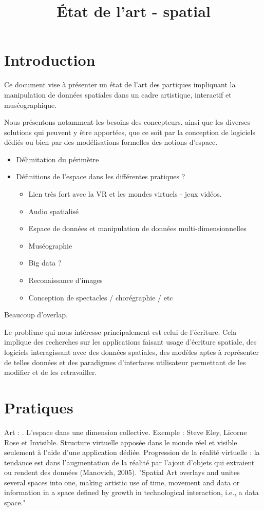 \documentclass[french,12pt]{article}
\title{État de l'art - spatial}
\begin{document}
\maketitle

\section{Introduction}
Ce document vise à présenter un état de l'art des partiques impliquant la manipulation de 
données spatiales dans un cadre artistique, interactif et muséographique.

Nous présentons notamment les besoins des concepteurs, ainsi que les diverses solutions qui 
peuvent y être apportées, que ce soit par la conception de logiciels dédiés ou bien 
par des modélisations formelles des notions d'espace.
 
\begin{itemize}
    
\item Délimitation du périmètre
 
\item Définitions de l'espace dans les différentes pratiques ?
 
 \begin{itemize}
  \item Lien très fort avec la VR et les mondes virtuels - jeux vidéos.
  \item Audio spatialisé
  \item Espace de données et manipulation de données multi-dimensionnelles
  \item Muséographie
  \item Big data ?
  \item Reconaissance d'images 
  \item Conception de spectacles / chorégraphie / etc
\end{itemize}

\end{itemize}

Beaucoup d'overlap.
  
Le problème qui nous intéresse principalement est celui de l'écriture. Cela implique des recherches sur les applications faisant usage d'écriture spatiale, des logiciels interagissant avec des données spatiales, des modèles aptes à représenter de telles données et des paradigmes d'interfaces utilisateur permettant de les modifier et de les retravailler. 



\section{Pratiques}
Art : \cite{lodi_spatial_2014}. L'espace dans une dimension collective. Exemple : Steve Eley, Licorne Rose et Invisible. Structure virtuelle apposée dans le monde réel et visible seulement à l'aide d'une application dédiée. Progression de la réalité virtuelle : la tendance est dans l'augmentation de la réalité par l'ajout d'objets qui extraient ou rendent des données (Manovich, 2005). "Spatial Art overlays and unites several spaces into one, making artistic use of time, movement and data or information in a space defined by growth in technological interaction, i.e., a data space."
\end{document}
